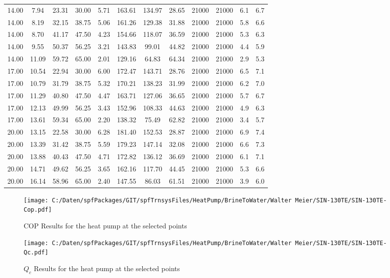 \documentclass[english]{SPFShortReport}
\begin{document}
\begin{table}[!ht]
\begin{small}
\begin{center}
{\begin{tabular}{l | c c c c c c c c c c c }
14.00 & 7.94 & 23.31 & 30.00 & 5.71 & 163.61 & 134.97 & 28.65 & 21000 & 21000 & 6.1 & 6.7\\ 
14.00 & 8.19 & 32.15 & 38.75 & 5.06 & 161.26 & 129.38 & 31.88 & 21000 & 21000 & 5.8 & 6.6\\ 
14.00 & 8.70 & 41.17 & 47.50 & 4.23 & 154.66 & 118.07 & 36.59 & 21000 & 21000 & 5.3 & 6.3\\ 
14.00 & 9.55 & 50.37 & 56.25 & 3.21 & 143.83 & 99.01 & 44.82 & 21000 & 21000 & 4.4 & 5.9\\ 
14.00 & 11.09 & 59.72 & 65.00 & 2.01 & 129.16 & 64.83 & 64.34 & 21000 & 21000 & 2.9 & 5.3\\ 
17.00 & 10.54 & 22.94 & 30.00 & 6.00 & 172.47 & 143.71 & 28.76 & 21000 & 21000 & 6.5 & 7.1\\ 
17.00 & 10.79 & 31.79 & 38.75 & 5.32 & 170.21 & 138.23 & 31.99 & 21000 & 21000 & 6.2 & 7.0\\ 
17.00 & 11.29 & 40.80 & 47.50 & 4.47 & 163.71 & 127.06 & 36.65 & 21000 & 21000 & 5.7 & 6.7\\ 
17.00 & 12.13 & 49.99 & 56.25 & 3.43 & 152.96 & 108.33 & 44.63 & 21000 & 21000 & 4.9 & 6.3\\ 
17.00 & 13.61 & 59.34 & 65.00 & 2.20 & 138.32 & 75.49 & 62.82 & 21000 & 21000 & 3.4 & 5.7\\ 
20.00 & 13.15 & 22.58 & 30.00 & 6.28 & 181.40 & 152.53 & 28.87 & 21000 & 21000 & 6.9 & 7.4\\ 
20.00 & 13.39 & 31.42 & 38.75 & 5.59 & 179.23 & 147.14 & 32.08 & 21000 & 21000 & 6.6 & 7.3\\ 
20.00 & 13.88 & 40.43 & 47.50 & 4.71 & 172.82 & 136.12 & 36.69 & 21000 & 21000 & 6.1 & 7.1\\ 
20.00 & 14.71 & 49.62 & 56.25 & 3.65 & 162.16 & 117.70 & 44.45 & 21000 & 21000 & 5.3 & 6.6\\ 
20.00 & 16.14 & 58.96 & 65.00 & 2.40 & 147.55 & 86.03 & 61.51 & 21000 & 21000 & 3.9 & 6.0\\ 
\hline
\hline
\end{tabular}
}
\label{ResultsTable}
\end{center}
\end{small}
\end{table}
\begin{figure}[!ht]
\begin{center}
\texttt{[image: C:/Daten/spfPackages/GIT/spfTrnsysFiles/HeatPump/BrineToWater/Walter Meier/SIN-130TE/SIN-130TE-Cop.pdf]}
\caption{COP Results for the heat pump at the selected points}
\label{COPFig}
\end{center}
\end{figure}
\begin{figure}[!ht]
\begin{center}
\texttt{[image: C:/Daten/spfPackages/GIT/spfTrnsysFiles/HeatPump/BrineToWater/Walter Meier/SIN-130TE/SIN-130TE-Qc.pdf]}
\caption{$Q_c$ Results for the heat pump at the selected points}
\label{QcFig}
\end{center}
\end{figure}
\end{document}
